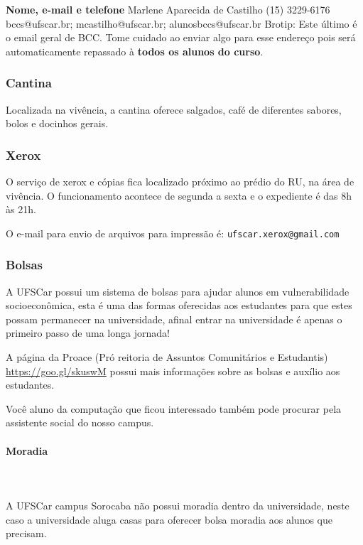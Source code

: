 \bigbreak
\noindent \textbf{Nome, e-mail e telefone}
  \newline Marlene Aparecida de Castilho
  \newline (15) 3229-6176
  \newline bccs@ufscar.br; mcastilho@ufscar.br; alunosbccs@ufscar.br
  \newline Brotip: Este último é o email geral de BCC. Tome cuidado ao enviar algo para esse endereço pois será automaticamente repassado à \textbf{todos os alunos do curso}.

\subsubsection{Cantina}
Localizada na vivência, a cantina oferece salgados, café de diferentes sabores, bolos e docinhos gerais.

\subsubsection{Xerox}
O serviço de xerox e cópias fica localizado próximo ao prédio do RU, na área de vivência. O funcionamento acontece de segunda a sexta e o expediente é das 8h às 21h.

O e-mail para envio de arquivos para impressão é: \texttt{ufscar.xerox@gmail.com}


\subsubsection{Bolsas}
A UFSCar possui um sistema de bolsas para ajudar alunos em vulnerabilidade socioeconômica, esta é uma das formas oferecidas aos estudantes para que estes possam permanecer na universidade, afinal entrar na universidade é apenas o primeiro passo de uma longa jornada!


A página da Proace (Pró reitoria de Assuntos Comunitários e Estudantis) \newline \url{https://goo.gl/skuswM} possui mais informações sobre as bolsas e auxílio aos estudantes.


Você aluno da computação que ficou interessado também pode procurar pela assistente social do nosso campus.

\paragraph{Moradia}\label{moradia}\mbox{} \\\\
\indent A UFSCar campus Sorocaba não possui moradia dentro da universidade, neste caso a universidade aluga casas para oferecer bolsa moradia aos alunos que precisam.

